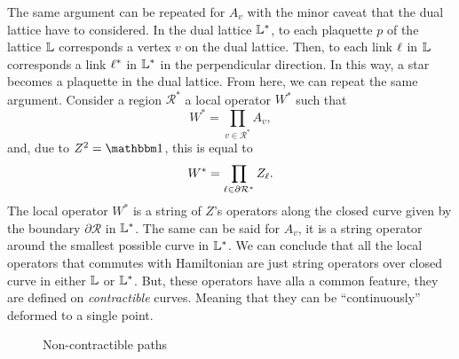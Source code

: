 The same argument can be repeated for $A_v$ with the minor caveat that the dual lattice have to considered.
In the dual lattice $\mathbb{L}^{\ast}$, to each plaquette $p$ of the lattice $\mathbb{L}$ corresponds a vertex $v$ on the dual lattice.
Then, to each link $\ell$ in $\mathbb{L}$ corresponds a link $\ell^{\ast}$ in $\mathbb{L}^{\ast}$ in the perpendicular direction.
In this way, a star becomes a plaquette in the dual lattice.
From here, we can repeat the same argument.
Consider a region $\mathcal{R}^{\ast}$ a local operator $W^{\ast}$ such that
\begin{equation}
    W^{\ast} = \prod_{v \in \mathcal{R}^{\ast}} A_v,
\end{equation}
and, due to $Z^2 = \identity$, this is equal to
\begin{equation}
    W^{\ast} = \prod_{\ell \in \partial \mathcal{R}^{\ast}} Z_{\ell}.
\end{equation}
The local operator $W^{\ast}$ is a string of $Z$'s operators along the closed curve given by the boundary $\partial \mathcal{R}$ in $\mathbb{L}^{\ast}$.
The same can be said for $A_v$, it is a string operator around the smallest possible curve in $\mathbb{L}^{\ast}$.
We can conclude that all the local operators that commutes with Hamiltonian are just string operators over closed curve in either $\mathbb{L}$ or $\mathbb{L}^{\ast}$.
But, these operators have alla a common feature, they are defined on \emph{contractible} curves.
Meaning that they can be ``continuously'' deformed to a single point.

\begin{figure}[t]
    \centering
    
    \caption{Non-contractible paths}
    \label{fig:nonlocal_operators_TC}
\end{figure}





